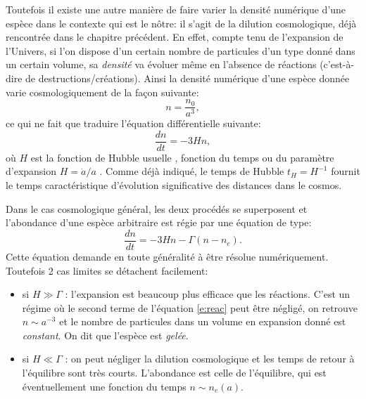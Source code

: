 Toutefois il existe une autre manière de faire varier la densité numérique d'une espèce dans le contexte qui est le nôtre: il s'agit de la dilution cosmologique, déjà rencontrée dans le chapitre précédent. En effet, compte tenu de l'expansion de l'Univers, si l'on dispose d'un certain nombre de particules d'un type donné dans un certain volume, sa \textit{densité} va évoluer même en l'absence de réactions (c'est-à-dire de destructions/créations). Ainsi la densité numérique d'une espèce donnée varie cosmologiquement de la façon suivante:
\begin{equation}
n=\frac{n_0}{a^3},
\end{equation}
ce qui ne fait que traduire l'équation différentielle suivante:
\begin{equation}
\frac{dn}{dt}=-3Hn,
\end{equation}
où $H$ est la fonction de Hubble usuelle , fonction du temps ou du paramètre d'expansion $H=\dot a/a$ . Comme déjà indiqué, le temps de Hubble $t_H=H^{-1}$ fournit le temps caractéristique d'évolution significative des distances dans le cosmos.

Dans le cas cosmologique général, les deux procédés se superposent et l'abondance d'une espèce arbitraire est régie par une équation de type:
\begin{equation}
\frac{dn}{dt}=-3Hn-\Gamma (n-n_e).
\label{e:reac}
\end{equation}
Cette équation demande en toute généralité à être résolue numériquement. Toutefois 2 cas limites se détachent facilement:
\begin{itemize}
\item si $H\gg \Gamma$ : l'expansion est beaucoup plus efficace que les réactions. C'est un régime où le second terme de l'équation \ref{e:reac} peut être négligé, on retrouve $n\sim a^{-3}$ et le nombre de particules dans un volume en expansion donné est \textit{constant}. On dit que l'espèce est \textit{gelée}.
\item si $H\ll \Gamma$ : on peut négliger la dilution cosmologique et les temps de retour à l'équilibre sont très courts. L'abondance est celle de l'équilibre, qui est éventuellement une fonction du temps $n\sim n_e(a)$.
\end{itemize}

